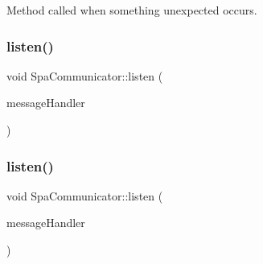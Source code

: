 Method called when something unexpected occurs. 

\mbox{\label{classSpaCommunicator_ae1634fbdc0d08ca8dd1dd5ba6fa18bbe}} 
\subsubsection{\texorpdfstring{listen()}{listen()}\hspace{0.1cm}{\footnotesize\ttfamily [1/2]}}
{\footnotesize\ttfamily void Spa\+Communicator\+::listen (\begin{DoxyParamCaption}\item[{std\+::function$<$ void(\hyperlink{structcubiumServerSocket__t}{cubium\+Server\+Socket\+\_\+t} $\ast$)$>$}]{message\+Handler }\end{DoxyParamCaption})\hspace{0.3cm}{\ttfamily [virtual]}}

\mbox{\label{classSpaCommunicator_af7af26aa5e511a039c036fcbb03735c6}} 
\subsubsection{\texorpdfstring{listen()}{listen()}\hspace{0.1cm}{\footnotesize\ttfamily [2/2]}}
{\footnotesize\ttfamily void Spa\+Communicator\+::listen (\begin{DoxyParamCaption}\item[{std\+::function$<$ void(\hyperlink{structcubiumClientSocket__t}{cubium\+Client\+Socket\+\_\+t} $\ast$)$>$}]{message\+Handler }\end{DoxyParamCaption})\hspace{0.3cm}{\ttfamily [virtual]}}

\mbox{\label{classSpaCommunicator_a063bb5ab2b09a46dbf296d151edae289}} 
